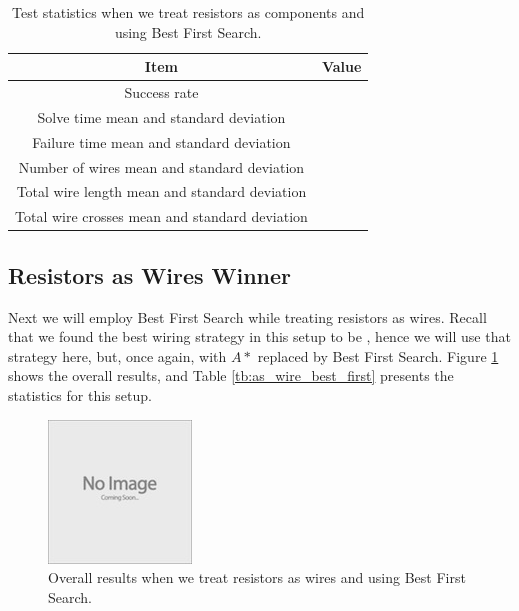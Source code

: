 \begin{table}[H]
\begin{center}
\begin{singlespace}
\begin{tabular}{| c | c |}
\hline
Item & Value \\
\hline\hline
Success rate & \\
Solve time mean and standard deviation & \\
Failure time mean and standard deviation & \\
Number of wires mean and standard deviation & \\
Total wire length mean and standard deviation & \\
Total wire crosses mean and standard deviation & \\
\hline
\end{tabular}
\end{singlespace}
\end{center}
\label{tb:as_comp_best_first}
\caption{Test statistics when we treat resistors as components and \q using Best
First Search.}
\end{table}

\subsection{Resistors as Wires Winner}

Next we will employ Best First Search while treating resistors as wires. Recall
that we found the best wiring strategy in this setup to be \q, hence we will use
that strategy here, but, once again, with $A*$ replaced by Best First Search.
Figure \ref{fig:as_wire_best_first} shows the overall results, and Table
\ref{tb:as_wire_best_first} presents the statistics for this setup.

\begin{figure}[H]
\begin{center}
\includegraphics{Images/placeholder.jpg}
\caption{Overall results when we treat resistors as wires and \q using Best
First Search.}
\label{fig:as_wire_best_first}
\end{center}
\end{figure}

